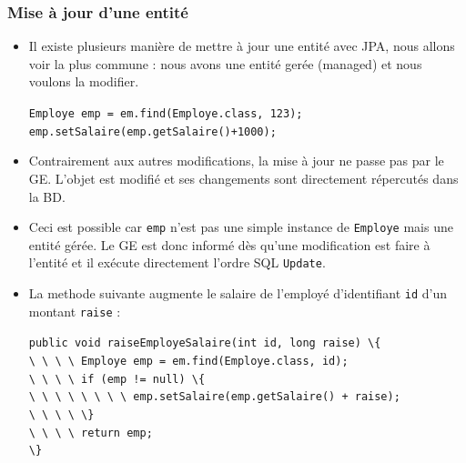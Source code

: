 \documentclass[xcolor=pdftex,x11names,table]{beamer}
\begin{document}
  \begin{frame}[allowframebreaks]
    \frametitle{Mise à jour d'une entité}
    \begin{itemize}
		  \item Il existe plusieurs manière de mettre à jour une entité avec JPA, nous allons voir la plus commune : 
		  nous avons une entité gerée (managed) et nous voulons la modifier.
		  	\begin{block}{}
						\lstinline$Employe emp = em.find(Employe.class, 123);$\\
						\lstinline$emp.setSalaire(emp.getSalaire()+1000);$\\
				\end{block}
			\item Contrairement aux autres modifications, la mise à jour ne passe pas par le GE. L'objet est modifié et ses 
			changements sont directement répercutés dans la BD.
			\item Ceci est possible car \texttt{emp} n'est pas une simple instance de \texttt{Employe} mais une entité gérée.
			Le GE est donc informé dès qu'une modification est faire à l'entité et il exécute directement l'ordre SQL \texttt{Update}. 
		  \item La methode suivante augmente le salaire de l'employé d'identifiant \texttt{id} d'un montant \texttt{raise} :
		  	\begin{block}{}
					\lstinline$public void raiseEmployeSalaire(int id, long raise) \{$\\
					\lstinline$\ \ \ \ Employe emp = em.find(Employe.class, id);$\\
					\lstinline$\ \ \ \ if (emp != null) \{$\\
					\lstinline$\ \ \ \ \ \ \ \ emp.setSalaire(emp.getSalaire() + raise);$\\
					\lstinline$\ \ \ \ \}$\\
					\lstinline$\ \ \ \ return emp;$\\
					\lstinline$\}$\\
				\end{block}
		\end{itemize}
  \end{frame}
\end{document}
